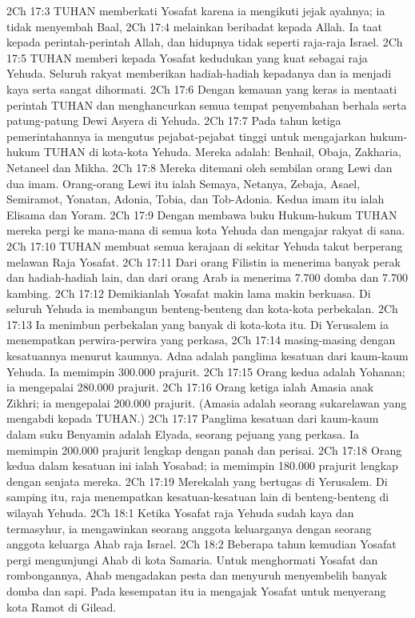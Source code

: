 2Ch 17:3  TUHAN memberkati Yosafat karena ia mengikuti jejak ayahnya; ia tidak menyembah Baal,
2Ch 17:4  melainkan beribadat kepada Allah. Ia taat kepada perintah-perintah Allah, dan hidupnya tidak seperti raja-raja Israel.
2Ch 17:5  TUHAN memberi kepada Yosafat kedudukan yang kuat sebagai raja Yehuda. Seluruh rakyat memberikan hadiah-hadiah kepadanya dan ia menjadi kaya serta sangat dihormati.
2Ch 17:6  Dengan kemauan yang keras ia mentaati perintah TUHAN dan menghancurkan semua tempat penyembahan berhala serta patung-patung Dewi Asyera di Yehuda.
2Ch 17:7  Pada tahun ketiga pemerintahannya ia mengutus pejabat-pejabat tinggi untuk mengajarkan hukum-hukum TUHAN di kota-kota Yehuda. Mereka adalah: Benhail, Obaja, Zakharia, Netaneel dan Mikha.
2Ch 17:8  Mereka ditemani oleh sembilan orang Lewi dan dua imam. Orang-orang Lewi itu ialah Semaya, Netanya, Zebaja, Asael, Semiramot, Yonatan, Adonia, Tobia, dan Tob-Adonia. Kedua imam itu ialah Elisama dan Yoram.
2Ch 17:9  Dengan membawa buku Hukum-hukum TUHAN mereka pergi ke mana-mana di semua kota Yehuda dan mengajar rakyat di sana.
2Ch 17:10  TUHAN membuat semua kerajaan di sekitar Yehuda takut berperang melawan Raja Yosafat.
2Ch 17:11  Dari orang Filistin ia menerima banyak perak dan hadiah-hadiah lain, dan dari orang Arab ia menerima 7.700 domba dan 7.700 kambing.
2Ch 17:12  Demikianlah Yosafat makin lama makin berkuasa. Di seluruh Yehuda ia membangun benteng-benteng dan kota-kota perbekalan.
2Ch 17:13  Ia menimbun perbekalan yang banyak di kota-kota itu. Di Yerusalem ia menempatkan perwira-perwira yang perkasa,
2Ch 17:14  masing-masing dengan kesatuannya menurut kaumnya. Adna adalah panglima kesatuan dari kaum-kaum Yehuda. Ia memimpin 300.000 prajurit.
2Ch 17:15  Orang kedua adalah Yohanan; ia mengepalai 280.000 prajurit.
2Ch 17:16  Orang ketiga ialah Amasia anak Zikhri; ia mengepalai 200.000 prajurit. (Amasia adalah seorang sukarelawan yang mengabdi kepada TUHAN.)
2Ch 17:17  Panglima kesatuan dari kaum-kaum dalam suku Benyamin adalah Elyada, seorang pejuang yang perkasa. Ia memimpin 200.000 prajurit lengkap dengan panah dan perisai.
2Ch 17:18  Orang kedua dalam kesatuan ini ialah Yosabad; ia memimpin 180.000 prajurit lengkap dengan senjata mereka.
2Ch 17:19  Merekalah yang bertugas di Yerusalem. Di samping itu, raja menempatkan kesatuan-kesatuan lain di benteng-benteng di wilayah Yehuda.
2Ch 18:1  Ketika Yosafat raja Yehuda sudah kaya dan termasyhur, ia mengawinkan seorang anggota keluarganya dengan seorang anggota keluarga Ahab raja Israel.
2Ch 18:2  Beberapa tahun kemudian Yosafat pergi mengunjungi Ahab di kota Samaria. Untuk menghormati Yosafat dan rombongannya, Ahab mengadakan pesta dan menyuruh menyembelih banyak domba dan sapi. Pada kesempatan itu ia mengajak Yosafat untuk menyerang kota Ramot di Gilead.
